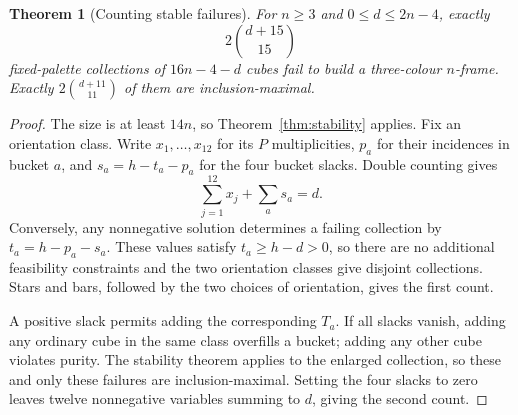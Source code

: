 \documentclass[11pt]{article}
\newtheorem{theorem}{Theorem}
\theoremstyle{remark}
\begin{document}
\begin{theorem}[Counting stable failures]\label{thm:stability-count}
For $n\ge3$ and $0\le d\le2n-4$, exactly
\[
 2\binom{d+15}{15}
\]
fixed-palette collections of $16n-4-d$ cubes fail to build a three-colour
$n$-frame. Exactly $2\binom{d+11}{11}$ of them are inclusion-maximal.
\end{theorem}
\begin{proof}
The size is at least $14n$, so Theorem~\ref{thm:stability} applies. Fix an
orientation class. Write $x_1,\ldots,x_{12}$ for its $P$ multiplicities,
$p_a$ for their incidences in bucket $a$, and
$s_a=h-t_a-p_a$ for the four bucket slacks. Double counting gives
\[
 \sum_{j=1}^{12}x_j+\sum_a s_a=d.
\]
Conversely, any nonnegative solution determines a failing collection by
$t_a=h-p_a-s_a$. These values satisfy $t_a\ge h-d>0$, so there are no
additional feasibility constraints and the two orientation classes give
disjoint collections. Stars and bars, followed by the two choices of
orientation, gives the first count.

A positive slack permits adding the corresponding $T_a$. If all slacks
vanish, adding any ordinary cube in the same class overfills a bucket;
adding any other cube violates purity. The stability theorem applies to
the enlarged collection, so these and only these failures are
inclusion-maximal. Setting the four slacks to zero leaves twelve
nonnegative variables summing to $d$, giving the second count.
\end{proof}
\end{document}
